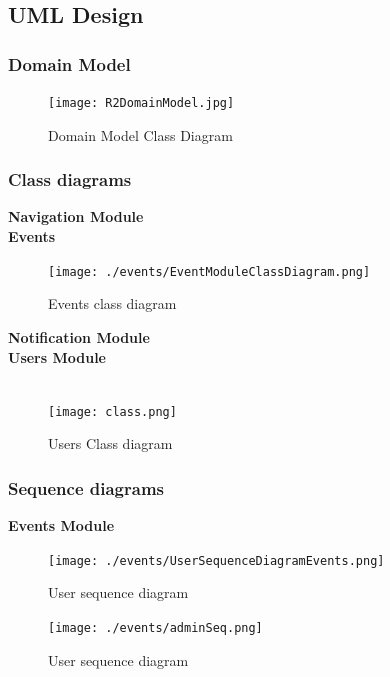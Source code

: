 \documentclass[a4paper,12pt]{report}
\begin{document}
\newpage
\subsection{UML Design}
\subsubsection{Domain Model}
\begin{figure}[h!]
	\texttt{[image: R2DomainModel.jpg]}
    \caption{Domain Model Class Diagram}
		 \label{fig:R2DomainModel}
\end{figure}

	\subsubsection{Class diagrams}
	\textbf{Navigation Module}\\
	\textbf{Events}\\
	\begin{figure}[h!]
	\texttt{[image: ./events/EventModuleClassDiagram.png]}
         \caption{Events class diagram}
			 \label{fig:Event Module}
	\end{figure}
	\textbf{Notification Module}\\
	\textbf{Users Module}\\\\
	\begin{figure}[h!]
		\texttt{[image: class.png]}
		\caption{Users Class diagram}
		\label{fig:Users Class diagram}
	\end{figure}
	\subsubsection{Sequence diagrams}
	\textbf{Events Module}
\begin{figure}[h!]
	\texttt{[image: ./events/UserSequenceDiagramEvents.png]}
    \caption{User sequence diagram}
		 \label{fig:1}
\end{figure}
\begin{figure}[h!]
	\texttt{[image: ./events/adminSeq.png]}
    \caption{User sequence diagram}
		 \label{fig:1}
\end{figure}
\end{document}
